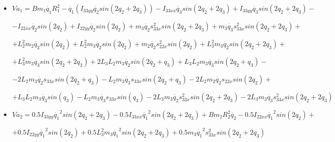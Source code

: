 \newpage
\begin{itemize}
	
	\item $Va_{1}=Bm_{1}\dot{q_{1}}R_{1}^{2} -\dot{q_{1}}(I_{33yy}\dot{q_{2}} sin(2q_{2}+2q_{3})) -I_{33xx}\dot{q_{3}} sin(2q_{2}+2q_{3}) +I_{33yy}\dot{q_{3}}sin(2q_{2}+2q_{3})- $ \\ \vspace{0.1cm}
	
	$ -I_{22xx}\dot{q_{2}} sin(2q_{2}) +I_{22yy}\dot{q_{2}} sin(2q_{2}) +  m_{3}\dot{q_{2}}s_{33x}^{2}sin(2q_{2}+2q_{3}) + m_{3}\dot{q_{3}}s_{33x}^{2}sin(2q_{2}+2q_{3}) +$ \\ \vspace{0.1cm}
	
	$  +L_{2}^{2}m_2 \dot{q_{2}}sin(2q_{2}) + L_{2}^{2}m_{3}\dot{q_{2}}sin( 2q_{2}) +  m_{2}\dot{q_{2}}s_{22x}^{2}sin(2q_{2}) +L_{3}^{2}m_{3} \dot{q_{2}}sin(2q_{2}+2q_{3}) +$ \\ \vspace{0.1cm}
	
	$ + L_{3}^{2}m_{3} \dot{q_{3}}sin(2q_{2}+2q_{3}) +  2L_{3}L_{2}m_{3} \dot{q_{2}}sin(2q_{2}+q_{3}) +L_{3}L_{2}m_{3} \dot{q_{3}}sin(2q_{2}+q_{3}) - $ \\ \vspace{0.1cm}
	
	$ -2L_{2}m_{3}\dot{q_{2}}s_{33x}sin(2q_{2}+q_{3})- L_{2}m_{3}\dot{q_{3}}s_{33x}sin(2q_{2}+q_{3}) -2L_{2}m_{2}\dot{q_{2}}s_{22x}sin(2q_{2}) +$ \\ \vspace{0.1cm}
	
	$ +L_{3}L_{2}m_{3} \dot{q_{3}}sin(q_{3}) -L_{2}m_{3} \dot{q_{3}}s_{33x}sin(q_{3}) -2L_{3}m_{3}\dot{q_{2}}s_{33x}^{2}sin(2q_{2}+2q_{3}) - 2L_{3}m_{3}\dot{q_{3}}s_{33x}^{2}sin(2q_{2}+2q_{3})  $ \\ \vspace{0.2cm}
	
	
	
	\item $Va_{2}=0.5I_{33yy}\dot{q_{1}}^{2}sin(2q_{2}+2q_{3}) -0.5I_{33xx}\dot{q_{1}}^{2}sin(2q_{2}+2q_{3}) +Bm_{2}R_{2}^{2}\dot{q_{2}} -0.5I_{22xx}\dot{q_{1}}^{2}sin(2q_{2})+ $ \\ \vspace{0.1cm}
	
	$+0.5I_{22yy}\dot{q_{1}}^{2}sin(2q_{2}) +0.5L_{3}^{2}m_{3} \dot{q_{1}}^{2}sin(2q_{2}+2q_{3}) +0.5m_{3}\dot{q_{1}}^{2}s_{33x}^{2}sin(2q_{2}+2q_{3}) $ \\ \vspace{0.1cm}
	

\end{itemize}
